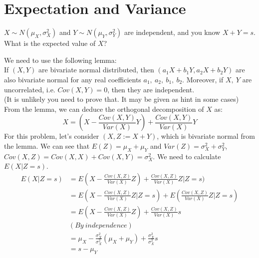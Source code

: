 \section{Expectation and Variance}
\begin{exe}
$X \sim N(\mu_X, \sigma_X^2)$ and $Y \sim N(\mu_Y, \sigma_Y^2)$ are independent, and you know $X + Y = s$. What is the expected value of $X$?
\end{exe}
\begin{teacher}
\begin{sol}
We need to use the following lemma:\\ 
If $(X, Y)$ are bivariate normal distributed, then $(a_1X+b_1Y, a_2X+b_2Y)$ are also bivariate normal for any real coefficients $a_1,\ a_2,\ b_1,\ b_2$. Moreover, if $X,\ Y$ are uncorrelated, i.e. $Cov(X, Y)=0$, then they are independent.\\
(It is unlikely you need to prove that. It may be given as hint in some cases)\\
From the lemma, we can deduce the orthogonal decomposition of $X$ as:
$$X=(X-\frac{Cov(X,Y)}{Var(X)}Y) + \frac{Cov(X,Y)}{Var(X)}Y$$
For this problem, let's consider $(X, Z:=X+Y)$, which is bivariate normal from the lemma. We can see that $E(Z) = \mu_X+\mu_Y$ and $Var(Z) = \sigma_X^2+\sigma_Y^2$, $Cov(X,Z)= Cov(X,X)+Cov(X,Y) = \sigma_X^2$. We need to calculate $E(X|Z=s)$.
\begin{align*}
    E(X|Z=s) &=E(X-\frac{Cov(X,Z)}{Var(X)}Z) + \frac{Cov(X,Z)}{Var(X)}Z|Z=s)\\
    &=E(X-\frac{Cov(X,Z)}{Var(X)}Z|Z=s) + E(\frac{Cov(X,Z)}{Var(X)}Z|Z=s)\\
    &=E(X-\frac{Cov(X,Z)}{Var(X)}Z)+\frac{Cov(X,Z)}{Var(X)}s\\
    &(By\ independence)\\
    &=\mu_X - \frac{\sigma_X^2}{\sigma_X^2}(\mu_X+\mu_Y) + \frac{\sigma_X^2}{\sigma_X^2}s\\
    &=s-\mu_Y
\end{align*}
\end{sol}
\end{teacher}

